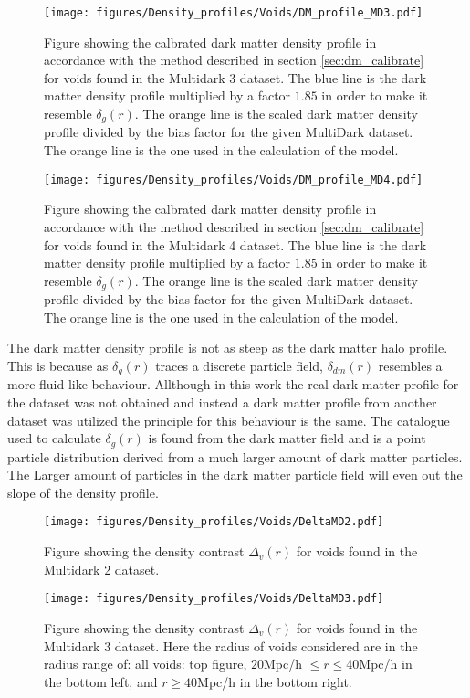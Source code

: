 \begin{figure}[htbp]\label{fig:deltadmMD3}
    \texttt{[image: figures/Density\_profiles/Voids/DM\_profile\_MD3.pdf]}
    \caption{Figure showing the calbrated dark matter density profile in accordance with the method described in section \ref{sec:dm_calibrate} for voids found in the Multidark 3 dataset. The blue line is the dark matter density profile multiplied by a factor $1.85$ in order to make it resemble $\delta_g(r)$. The orange line is the scaled dark matter density profile divided by the bias factor for the given MultiDark dataset. The orange line is the one used in the calculation of the model.}
\end{figure}

\begin{figure}[htbp]\label{fig:deltadmMD4}
    \texttt{[image: figures/Density\_profiles/Voids/DM\_profile\_MD4.pdf]}
    \caption{Figure showing the calbrated dark matter density profile in accordance with the method described in section \ref{sec:dm_calibrate} for voids found in the Multidark 4 dataset. The blue line is the dark matter density profile multiplied by a factor $1.85$ in order to make it resemble $\delta_g(r)$. The orange line is the scaled dark matter density profile divided by the bias factor for the given MultiDark dataset. The orange line is the one used in the calculation of the model.}
\end{figure}
The dark matter density profile is not as steep as the dark matter halo profile. This is because as $\delta_g(r)$ traces a discrete particle field, $\delta_{dm}(r)$ resembles a more fluid like behaviour. Allthough in this work the real dark matter profile for the dataset was not obtained and instead a dark matter profile from another dataset was utilized the principle for this behaviour is the same. The catalogue used to calculate $\delta_g(r)$ is found from the dark matter field and is a point particle distribution derived from a much larger amount of dark matter particles. The Larger amount of particles in the dark matter particle field will even out the slope of the density profile.\\\indent
\begin{figure}[htbp]\label{fig:DeltaMD2}
    \texttt{[image: figures/Density\_profiles/Voids/DeltaMD2.pdf]}
    \caption{Figure showing the density contrast $\Delta_v(r)$ for voids found in the Multidark 2 dataset.}
\end{figure}
\begin{figure}[htbp]\label{fig:DeltaMD3}
    \texttt{[image: figures/Density\_profiles/Voids/DeltaMD3.pdf]}
    \caption{Figure showing the density contrast $\Delta_v(r)$ for voids found in the Multidark 3 dataset. Here the radius of voids considered are in the radius range of: all voids: top figure, $20$Mpc/h $\leq r\leq 40$Mpc/h in the bottom left, and $r\geq 40$Mpc/h in the bottom right.}
\end{figure}
